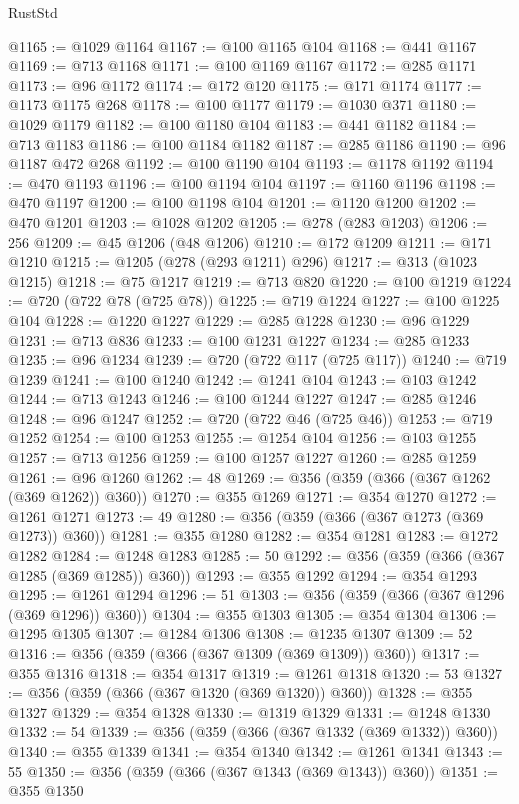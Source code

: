 \begin{lexlean}{RustStd}
\begin{coremodule}
@1165 := @1029 @1164
@1167 := @100 @1165 @104
@1168 := @441 @1167
@1169 := @713 @1168
@1171 := @100 @1169 @1167
@1172 := @285 @1171
@1173 := @96 @1172
@1174 := @172 @120
@1175 := @171 @1174
@1177 := @1173 @1175 @268
@1178 := @100 @1177
@1179 := @1030 @371
@1180 := @1029 @1179
@1182 := @100 @1180 @104
@1183 := @441 @1182
@1184 := @713 @1183
@1186 := @100 @1184 @1182
@1187 := @285 @1186
@1190 := @96 @1187 @472 @268
@1192 := @100 @1190 @104
@1193 := @1178 @1192
@1194 := @470 @1193
@1196 := @100 @1194 @104
@1197 := @1160 @1196
@1198 := @470 @1197
@1200 := @100 @1198 @104
@1201 := @1120 @1200
@1202 := @470 @1201
@1203 := @1028 @1202
@1205 := @278 (@283 @1203)
@1206 := 256
@1209 := @45 @1206 (@48 @1206)
@1210 := @172 @1209
@1211 := @171 @1210
@1215 := @1205 (@278 (@293 @1211) @296)
@1217 := @313 (@1023 @1215)
@1218 := @75 @1217
@1219 := @713 @820
@1220 := @100 @1219
@1224 := @720 (@722 @78 (@725 @78))
@1225 := @719 @1224
@1227 := @100 @1225 @104
@1228 := @1220 @1227
@1229 := @285 @1228
@1230 := @96 @1229
@1231 := @713 @836
@1233 := @100 @1231 @1227
@1234 := @285 @1233
@1235 := @96 @1234
@1239 := @720 (@722 @117 (@725 @117))
@1240 := @719 @1239
@1241 := @100 @1240
@1242 := @1241 @104
@1243 := @103 @1242
@1244 := @713 @1243
@1246 := @100 @1244 @1227
@1247 := @285 @1246
@1248 := @96 @1247
@1252 := @720 (@722 @46 (@725 @46))
@1253 := @719 @1252
@1254 := @100 @1253
@1255 := @1254 @104
@1256 := @103 @1255
@1257 := @713 @1256
@1259 := @100 @1257 @1227
@1260 := @285 @1259
@1261 := @96 @1260
@1262 := 48
@1269 := @356 (@359 (@366 (@367 @1262 (@369 @1262)) @360))
@1270 := @355 @1269
@1271 := @354 @1270
@1272 := @1261 @1271
@1273 := 49
@1280 := @356 (@359 (@366 (@367 @1273 (@369 @1273)) @360))
@1281 := @355 @1280
@1282 := @354 @1281
@1283 := @1272 @1282
@1284 := @1248 @1283
@1285 := 50
@1292 := @356 (@359 (@366 (@367 @1285 (@369 @1285)) @360))
@1293 := @355 @1292
@1294 := @354 @1293
@1295 := @1261 @1294
@1296 := 51
@1303 := @356 (@359 (@366 (@367 @1296 (@369 @1296)) @360))
@1304 := @355 @1303
@1305 := @354 @1304
@1306 := @1295 @1305
@1307 := @1284 @1306
@1308 := @1235 @1307
@1309 := 52
@1316 := @356 (@359 (@366 (@367 @1309 (@369 @1309)) @360))
@1317 := @355 @1316
@1318 := @354 @1317
@1319 := @1261 @1318
@1320 := 53
@1327 := @356 (@359 (@366 (@367 @1320 (@369 @1320)) @360))
@1328 := @355 @1327
@1329 := @354 @1328
@1330 := @1319 @1329
@1331 := @1248 @1330
@1332 := 54
@1339 := @356 (@359 (@366 (@367 @1332 (@369 @1332)) @360))
@1340 := @355 @1339
@1341 := @354 @1340
@1342 := @1261 @1341
@1343 := 55
@1350 := @356 (@359 (@366 (@367 @1343 (@369 @1343)) @360))
@1351 := @355 @1350

\end{coremodule}
\end{lexlean}
